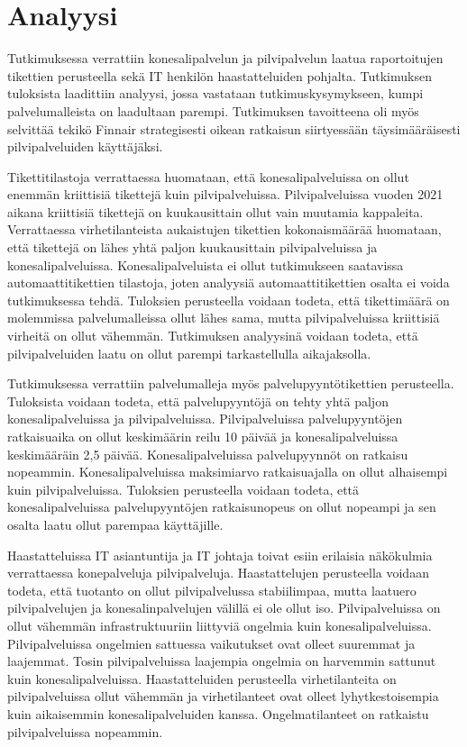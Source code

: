 \chapter{Analyysi\label{analyysi}}
Tutkimuksessa verrattiin konesalipalvelun ja pilvipalvelun laatua raportoitujen tikettien perusteella sekä IT henkilön haastatteluiden pohjalta. Tutkimuksen tuloksista laadittiin analyysi, jossa vastataan tutkimuskysymykseen, kumpi palvelumalleista on laadultaan parempi. Tutkimuksen tavoitteena oli myös selvittää tekikö Finnair strategisesti oikean ratkaisun siirtyessään täysimääräisesti pilvipalveluiden käyttäjäksi.

Tikettitilastoja verrattaessa huomataan, että konesalipalveluissa on ollut enemmän kriittisiä tikettejä kuin pilvipalveluissa.  Pilvipalveluissa vuoden 2021 aikana kriittisiä tikettejä on kuukausittain ollut vain muutamia kappaleita. Verrattaessa virhetilanteista aukaistujen tikettien kokonaismäärää huomataan, että tikettejä on lähes yhtä paljon kuukausittain pilvipalveluissa ja konesalipalveluissa. Konesalipalveluista ei ollut tutkimukseen saatavissa automaattitikettien tilastoja, joten analyysiä automaattitikettien osalta ei voida tutkimuksessa tehdä. Tuloksien perusteella voidaan todeta, että tikettimäärä on molemmissa palvelumalleissa ollut lähes sama, mutta pilvipalveluissa kriittisiä virheitä on ollut vähemmän. Tutkimuksen analyysinä voidaan todeta, että pilvipalveluiden laatu on ollut parempi tarkastellulla aikajaksolla.

Tutkimuksessa verrattiin palvelumalleja myös palvelupyyntötikettien perusteella. Tuloksista voidaan todeta, että palvelupyyntöjä on tehty yhtä paljon konesalipalveluissa ja pilvipalveluissa. Pilvipalveluissa palvelupyyntöjen ratkaisuaika on ollut keskimäärin reilu 10 päivää ja konesalipalveluissa keskimääräin 2,5 päivää. Konesalipalveluissa palvelupyynnöt on ratkaisu nopeammin. Konesalipalveluissa maksimiarvo ratkaisuajalla on ollut alhaisempi kuin pilvipalveluissa. Tuloksien perusteella voidaan todeta, että konesalipalveluissa palvelupyyntöjen ratkaisunopeus on ollut nopeampi ja sen osalta laatu ollut parempaa käyttäjille.

Haastatteluissa IT asiantuntija ja IT johtaja toivat esiin erilaisia näkökulmia verrattaessa konepalveluja pilvipalveluja. Haastattelujen perusteella voidaan todeta, että tuotanto on ollut pilvipalvelussa stabiilimpaa, mutta laatuero pilvipalvelujen ja konesalinpalvelujen välillä ei ole ollut iso. Pilvipalveluissa on ollut vähemmän infrastruktuuriin liittyviä ongelmia kuin konesalipalveluissa. Pilvipalveluissa ongelmien sattuessa vaikutukset ovat olleet suuremmat ja laajemmat. Tosin pilvipalveluissa laajempia ongelmia on harvemmin sattunut kuin konesalipalveluissa. Haastatteluiden perusteella virhetilanteita on pilvipalveluissa ollut vähemmän ja virhetilanteet ovat olleet lyhytkestoisempia kuin aikaisemmin konesalipalveluiden kanssa. Ongelmatilanteet on ratkaistu pilvipalveluissa nopeammin.

